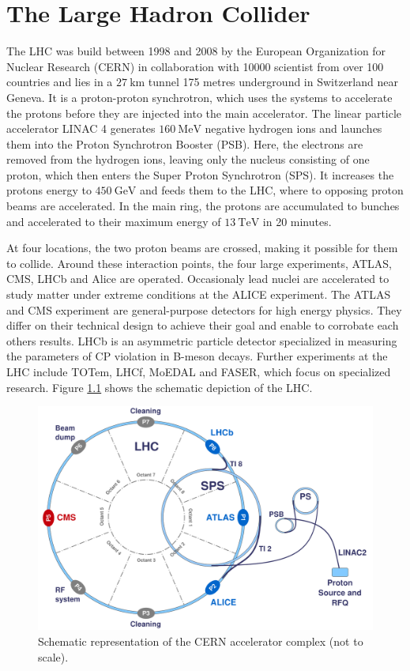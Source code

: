 \chapter{The Large Hadron Collider}
The LHC was build between 1998 and 2008 by the European Organization for Nuclear Research (CERN) in collaboration with 10000 scientist from over 100 countries
and lies in a $\SI{27}{\kilo\meter}$ tunnel 175 metres underground in Switzerland near Geneva. It is a proton-proton synchrotron, which uses
the systems to accelerate the protons before they are injected into the main accelerator. The linear particle accelerator LINAC 4 generates $\SI{160}{\mega\eV}$
negative hydrogen ions and launches them into the Proton Synchrotron Booster (PSB). Here, the electrons are removed from the hydrogen ions, leaving only the nucleus
consisting of one proton, which then enters the Super Proton Synchrotron (SPS). It increases the protons energy to $\SI{450}{\GeV}$ and feeds them to the
LHC, where to opposing proton beams are accelerated. In the main ring,
the protons are accumulated to bunches and accelerated to their maximum energy of $\SI{13}{\tera\eV}$ in 20 minutes.

At four locations, the two proton beams
are crossed, making it possible for them to collide. Around these interaction points, the four large experiments, ATLAS, CMS, LHCb and Alice are operated.
Occasionaly lead nuclei are accelerated to study matter under extreme conditions at the ALICE experiment. The ATLAS and CMS experiment are general-purpose detectors for
high energy physics. They differ on their technical design to achieve their goal and enable to corrobate each others results.
LHCb is an asymmetric particle detector specialized in measuring the parameters of CP violation in B-meson decays.
Further experiments at the LHC include TOTem, LHCf, MoEDAL and FASER, which focus on specialized research. Figure \ref{fig:lhc_aufbau} shows the schematic depiction
of the LHC.

\begin{figure}[H]
  \centering
  \includegraphics[height=0.4\textwidth]{images/lhc_aufbau.png}
  \caption{Schematic representation of the CERN accelerator complex (not to scale)\cite{lhc_aufbau}.}
  \label{fig:lhc_aufbau}
\end{figure}

